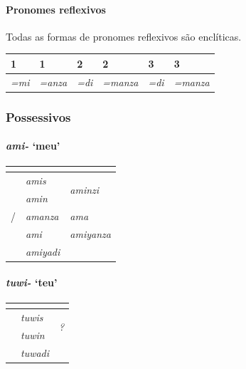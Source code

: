 \paragraph{Pronomes reflexivos}
Todas as formas de pronomes reflexivos são enclíticas.

\begin{center}
	\begin{tabular}[c]{ll|ll|ll}
		\toprule
		1\Sg{}\emph{} & 1\Pl{}\emph{} & 2\Sg{}\emph{} & 2\Pl{}\emph{} & 3\Sg{}\emph{} & 3\Pl{}\emph{} \\
		\midrule
		\emph{=mi}    & \emph{=anza}  & \emph{=di}    & \emph{=manza} & \emph{=di}    & \emph{=manza} \\
		\bottomrule
	\end{tabular}
\end{center}

\clearpage
\subsubsection{Possessivos}

\paragraph{\emph{ami-} `meu'}

\begin{center}
	\begin{tabular}[c]{lll}
		\toprule
		                      & \Sg{}\emph{}   & \Pl{}\emph{}                     \\
		\midrule
		\Nom{} \Com{}         & \emph{amis}    & \multirow{2}{4em}{\emph{aminzi}} \\
		\Acu{} \Com{}         & \emph{amin}    &                                  \\
		\Nom{}/\Acu{} \Neut{} & \emph{amanza}  & \emph{ama}                       \\
		\Dat{}                & \emph{ami}     & \emph{amiyanza}                  \\
		\Abl{}                & \emph{amiyadi} & \emph{}                          \\
		\bottomrule
	\end{tabular}
\end{center}

\paragraph{\emph{tuwi-} `teu'}
\begin{center}
	\begin{tabular}[c]{lll}
		\toprule
		              & \Sg{}\emph{}  & \Pl{}\emph{}                \\
		\midrule
		\Nom{} \Com{} & \emph{tuwis}  & \multirow{2}{4em}{\emph{?}} \\
		\Acu{} \Com{} & \emph{tuwin}  &                             \\
		\Abl{}        & \emph{tuwadi} & \emph{}                     \\
		\bottomrule
	\end{tabular}
\end{center}


